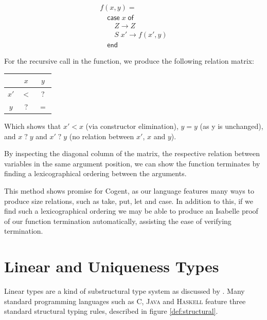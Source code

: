 \[
    \begin{array}{l}
    f(x,y) = \\
    \hspace{1em} \textsf{case}\; x\; \textsf{of} \\
    \hspace{2em}    Z    \rightarrow Z \\
    \hspace{2em}    S\; x' \rightarrow f(x',y) \\
    \hspace{1em} \textsf{end}
    \end{array}
\]

For the recursive call in the function, we produce the following relation matrix:

\begin{center}
    \begin{tabular}{c|cc}
             & $x$        & $y$ \\
        \hline
        $x'$ & $<$        & \textsf{?} \\
        $y$  & \textsf{?} & $=$ \\
    \end{tabular}
\end{center}

Which shows that $x' < x$ (via constructor elimination), $y = y$ (as y is unchanged),
and $x\; \textsf{?}\; y$ and $x'\; \textsf{?}\; y$ (no relation between $x'$, $x$ and $y$).

By inspecting the diagonal column of the matrix, the respective relation between variables
in the same argument position, we can show the function terminates by finding
a lexicographical ordering between the arguments.

This method shows promise for Cogent, as our language features many ways to produce
size relations, such as \textsf{take}, \textsf{put}, \textsf{let} and \textsf{case}.
In addition to this, if we find such a lexicographical ordering we may be able
to produce an Isabelle proof of our function termination automatically,
assisting the ease of verifying termination.

\section{Linear and Uniqueness Types}

Linear types are a kind of substructural type system as discussed by \citet{Substructural}.
Many standard programming languages such as \textsc{C}, \textsc{Java} and \textsc{Haskell} feature
three standard structural typing rules, described in figure \autoref{def:structural}.


